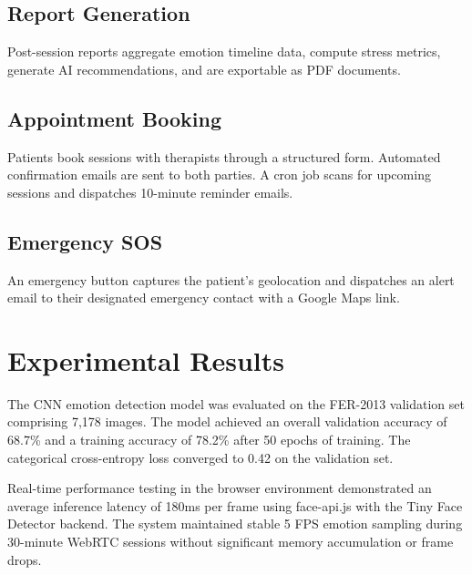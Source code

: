 \documentclass[conference]{IEEEtran}
\begin{document}
\subsection{Report Generation}
Post-session reports aggregate emotion timeline data, compute stress metrics, generate AI recommendations, and are exportable as PDF documents.
\subsection{Appointment Booking}
Patients book sessions with therapists through a structured form. Automated confirmation emails are sent to both parties. A cron job scans for upcoming sessions and dispatches 10-minute reminder emails.
\subsection{Emergency SOS}
An emergency button captures the patient's geolocation and dispatches an alert email to their designated emergency contact with a Google Maps link.
\section{Experimental Results}
The CNN emotion detection model was evaluated on the FER-2013 validation set comprising 7,178 images. The model achieved an overall validation accuracy of 68.7\% and a training accuracy of 78.2\% after 50 epochs of training. The categorical cross-entropy loss converged to 0.42 on the validation set.
\begin{table}[t]
\caption{Per-Class Emotion Detection Accuracy}
\centering
\footnotesize
\setlength{\tabcolsep}{4pt}
\renewcommand{\arraystretch}{1.15}
\end{table}
Real-time performance testing in the browser environment demonstrated an average inference latency of 180ms per frame using face-api.js with the Tiny Face Detector backend. The system maintained stable 5 FPS emotion sampling during 30-minute WebRTC sessions without significant memory accumulation or frame drops.
\end{document}
